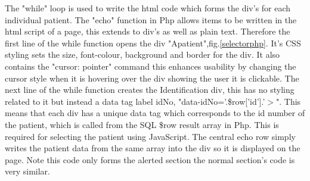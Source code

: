 \documentclass[11pt]{article}
\begin{document}
The "while" loop is used to write the html code which forms the div's for each individual patient. The "echo" function in Php allows items to be written in the html script of a page, this extends to div's as well as plain text. Therefore the first line of the while function opens the div "Apatient",fig.\ref{selectorphp}. It's CSS styling sets the size, font-colour, background and border for the div. It also contains the "cursor: pointer" command this enhances usability by changing the cursor style when it is hovering over the div showing the user it is clickable. The next line of the while function creates the Identification div, this has no styling related to it but instead a data tag label idNo, "data-idNo='.\$row['id'].'$>$". This means that each div has a unique data tag which corresponds to the id number of the patient, which is called from the SQL \$row result array in Php. This is required for selecting the patient using JavaScript. The central echo row simply writes the patient data from the same array into the div so it is displayed on the page. Note this code only forms the alerted section the normal section's code is very similar. 
\end{document}
